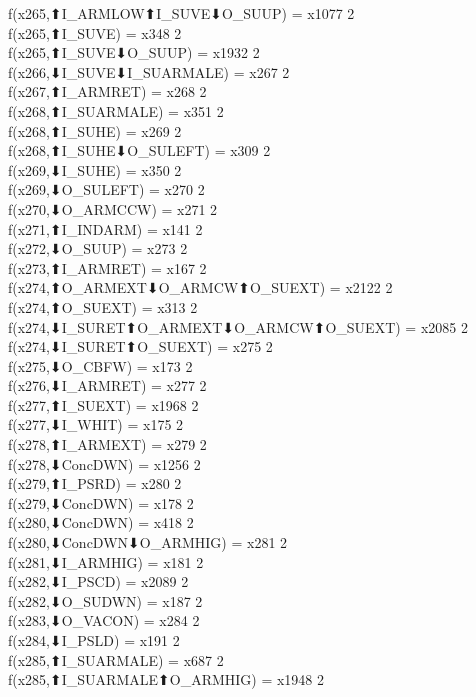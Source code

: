 f(x265,⬆I_ARMLOW⬆I_SUVE⬇O_SUUP) = x1077 {2} \\
f(x265,⬆I_SUVE) = x348 {2} \\
f(x265,⬆I_SUVE⬇O_SUUP) = x1932 {2} \\
f(x266,⬇I_SUVE⬇I_SUARMALE) = x267 {2} \\
f(x267,⬆I_ARMRET) = x268 {2} \\
f(x268,⬆I_SUARMALE) = x351 {2} \\
f(x268,⬆I_SUHE) = x269 {2} \\
f(x268,⬆I_SUHE⬇O_SULEFT) = x309 {2} \\
f(x269,⬇I_SUHE) = x350 {2} \\
f(x269,⬇O_SULEFT) = x270 {2} \\
f(x270,⬇O_ARMCCW) = x271 {2} \\
f(x271,⬆I_INDARM) = x141 {2} \\
f(x272,⬇O_SUUP) = x273 {2} \\
f(x273,⬆I_ARMRET) = x167 {2} \\
f(x274,⬆O_ARMEXT⬇O_ARMCW⬆O_SUEXT) = x2122 {2} \\
f(x274,⬆O_SUEXT) = x313 {2} \\
f(x274,⬇I_SURET⬆O_ARMEXT⬇O_ARMCW⬆O_SUEXT) = x2085 {2} \\
f(x274,⬇I_SURET⬆O_SUEXT) = x275 {2} \\
f(x275,⬇O_CBFW) = x173 {2} \\
f(x276,⬇I_ARMRET) = x277 {2} \\
f(x277,⬆I_SUEXT) = x1968 {2} \\
f(x277,⬇I_WHIT) = x175 {2} \\
f(x278,⬆I_ARMEXT) = x279 {2} \\
f(x278,⬇ConcDWN) = x1256 {2} \\
f(x279,⬆I_PSRD) = x280 {2} \\
f(x279,⬇ConcDWN) = x178 {2} \\
f(x280,⬇ConcDWN) = x418 {2} \\
f(x280,⬇ConcDWN⬇O_ARMHIG) = x281 {2} \\
f(x281,⬇I_ARMHIG) = x181 {2} \\
f(x282,⬇I_PSCD) = x2089 {2} \\
f(x282,⬇O_SUDWN) = x187 {2} \\
f(x283,⬇O_VACON) = x284 {2} \\
f(x284,⬇I_PSLD) = x191 {2} \\
f(x285,⬆I_SUARMALE) = x687 {2} \\
f(x285,⬆I_SUARMALE⬆O_ARMHIG) = x1948 {2} \\
